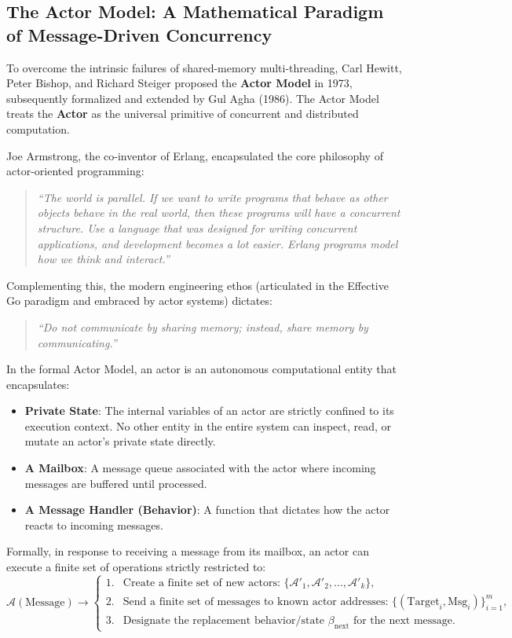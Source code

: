 \subsection{The Actor Model: A Mathematical Paradigm of Message-Driven Concurrency}
To overcome the intrinsic failures of shared-memory multi-threading, Carl Hewitt, Peter Bishop, and Richard Steiger proposed the \textbf{Actor Model} in 1973, subsequently formalized and extended by Gul Agha (1986). The Actor Model treats the \textbf{Actor} as the universal primitive of concurrent and distributed computation.

Joe Armstrong, the co-inventor of Erlang, encapsulated the core philosophy of actor-oriented programming:
\begin{quote}
\textit{“The world is parallel. If we want to write programs that behave as other objects behave in the real world, then these programs will have a concurrent structure. Use a language that was designed for writing concurrent applications, and development becomes a lot easier. Erlang programs model how we think and interact.”}
\end{quote}
Complementing this, the modern engineering ethos (articulated in the Effective Go paradigm and embraced by actor systems) dictates:
\begin{quote}
\textit{“Do not communicate by sharing memory; instead, share memory by communicating.”}
\end{quote}

In the formal Actor Model, an actor is an autonomous computational entity that encapsulates:
\begin{itemize}
    \item \textbf{Private State}: The internal variables of an actor are strictly confined to its execution context. No other entity in the entire system can inspect, read, or mutate an actor's private state directly.
    \item \textbf{A Mailbox}: A message queue associated with the actor where incoming messages are buffered until processed.
    \item \textbf{A Message Handler (Behavior)}: A function that dictates how the actor reacts to incoming messages.
\end{itemize}

Formally, in response to receiving a message from its mailbox, an actor can execute a finite set of operations strictly restricted to:
\begin{equation}
\mathcal{A}(\text{Message}) \longrightarrow \begin{cases}
1. & \text{Create a finite set of new actors: } \{\mathcal{A}'_1, \mathcal{A}'_2, \dots, \mathcal{A}'_k\}, \\
2. & \text{Send a finite set of messages to known actor addresses: } \{(\text{Target}_i, \text{Msg}_i)\}_{i=1}^m, \\
3. & \text{Designate the replacement behavior/state } \beta_{\text{next}} \text{ for the next message.}
\end{cases}
\end{equation}


